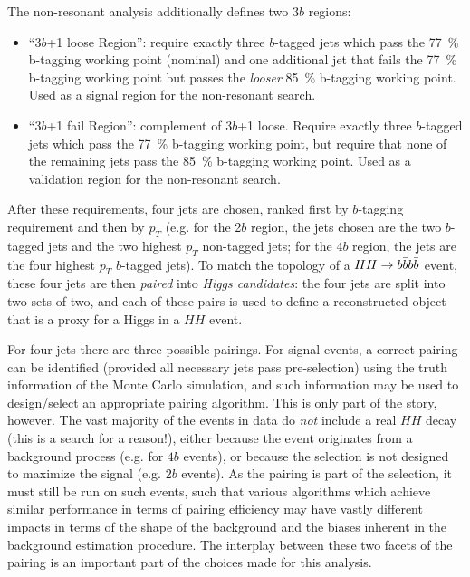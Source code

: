The non-resonant analysis additionally defines two $3b$ regions:
\begin{itemize}
	\item ``3$b$+1 loose Region'': require exactly three $b$-tagged jets which 
	pass the 77~\% b-tagging working point (nominal) and one additional jet that fails the  
	77~\% b-tagging working point but passes the \emph{looser} 85~\% b-tagging working point. Used 
	as a signal region for the non-resonant search.
	\item ``3$b$+1 fail Region'': complement of 3$b$+1 loose. Require exactly three $b$-tagged jets 
	which pass the 77~\% b-tagging working point, but require that none of the remaining jets pass 
	the 85~\% b-tagging working point. Used as a validation region for the non-resonant search.
\end{itemize}
After these requirements, four jets are chosen, ranked first by $b$-tagging requirement and then 
by $p_{T}$ (e.g. for the 2$b$ region, the jets chosen are the two $b$-tagged jets and the two 
highest $p_{T}$ non-tagged jets; for the $4b$ region, the jets are the four highest $p_{T}$ $b$-tagged
jets). To match the topology of a $HH\rightarrow b\bar{b}b\bar{b}$ event, these four jets are then \emph{paired}
into \emph{Higgs candidates}: the four jets are split into two sets of two, and each of these pairs is
used to define a reconstructed object that is a proxy for a Higgs in a $HH$ event. 

For four jets there are three possible pairings. For signal events, a correct pairing can be identified
(provided all necessary jets pass pre-selection) using the truth information of the Monte Carlo simulation, 
and such information may be used to design/select an appropriate pairing algorithm. This is only part of 
the story, however. The vast majority of the events in data do \emph{not} include a real $HH$ decay (this is 
a search for a reason!), either because the event originates from a background process (e.g. for $4b$ events), or 
because the selection is not designed to maximize the signal (e.g. $2b$ events). As the pairing is 
part of the selection, it must still be run on such events, such that various algorithms which achieve similar
performance in terms of pairing efficiency may have vastly different impacts in terms of the shape of the background
and the biases inherent in the background estimation procedure. The interplay between these two facets of the 
pairing is an important part of the choices made for this analysis.

